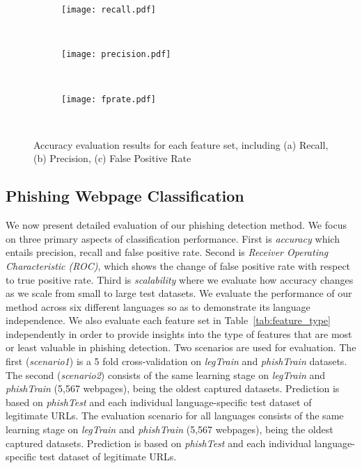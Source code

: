 \documentclass[10pt,conference,compsocconf,letterpaper]{IEEEtran}
\begin{document}
\iffullversion
\begin{figure*}[th]
        \begin{subfigure}[b]{0.33\textwidth}
                \centering
                \texttt{[image: recall.pdf]}
                \caption{}
                \label{fig:recall}
        \end{subfigure}~ \begin{subfigure}[b]{0.33\textwidth}
                \centering
                \texttt{[image: precision.pdf]}
                \caption{}
                \label{fig:precision}
        \end{subfigure}      
       ~ \begin{subfigure}[b]{0.33\textwidth}
                \centering
                \texttt{[image: fprate.pdf]}
                \caption{}
                \label{fig:fprate}
        \end{subfigure} 
         ~ \caption{Accuracy evaluation results for each feature set, including (a) Recall, (b) Precision, (c) False Positive Rate}\label{fig:main_fp_eval}
\end{figure*}
\else
\fi

\subsection{Phishing Webpage Classification}
\label{subsec:exp_classif}

We now present detailed evaluation of our phishing detection method. We focus on three primary aspects of 
classification performance. First is \emph{accuracy} which entails precision, recall and false positive rate. Second is \emph{Receiver Operating Characteristic (ROC)}, which shows the change of false positive rate with respect to true positive rate. Third is \emph{scalability} where we evaluate how accuracy changes as we scale from small to large test datasets. 
We evaluate the performance of our method across six different languages so as to demonstrate its language independence. 
\iffeateval
We also evaluate each feature set in Table~\ref{tab:feature_type} independently in order to provide insights into the type of features that are most or least valuable in phishing detection.
Two scenarios are used  for evaluation. The first (\textit{scenario1}) is a 5 fold cross-validation on \textit{legTrain} and \textit{phishTrain} datasets. The second (\textit{scenario2}) 
consists of the same learning stage on \textit{legTrain} and \textit{phishTrain} (5,567 webpages), being the oldest captured datasets. Prediction is based on \textit{phishTest} and each individual language-specific test dataset of legitimate URLs. 
\else
The evaluation scenario for all languages 
consists of the same learning stage on \textit{legTrain} and \textit{phishTrain} (5,567 webpages), being the oldest captured datasets. Prediction is based on \textit{phishTest} and each individual language-specific test dataset of legitimate URLs. 
\fi
\end{document}
